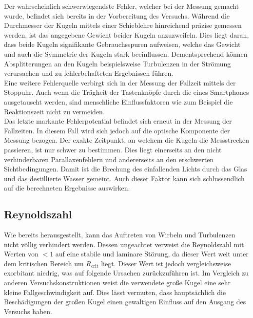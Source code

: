 Der wahrscheinlich schwerwiegendste Fehler, welcher bei der Messung gemacht wurde, befindet sich bereits in der Vorbereitung des 
Versuchs. Während die Durchmesser der Kugeln mittels einer Schieblehre hinreichend präzise gemessen werden, ist das angegebene 
Gewicht beider Kugeln anzuzweifeln. Dies liegt daran, dass beide Kugeln signifikante Gebrauchsspuren aufweisen, welche das Gewicht 
und auch die Symmetrie der Kugeln stark beeinflussen. Dementsprechend können Absplitterungen an den Kugeln beispielsweise Turbulenzen
in der Strömung verursachen und zu fehlerbehafteten Ergebnissen führen.\\
Eine weitere Fehlerquelle verbirgt sich in der Messung der Fallzeit mittels der Stoppuhr. Auch wenn die Trägheit der Tastenknöpfe durch 
die eines Smartphones ausgetauscht werden, sind menschliche Einflussfaktoren wie zum Beispiel die Reaktionszeit nicht zu vermeiden.\\
Das letzte markante Fehlerpotential befindet sich erneut in der Messung der Fallzeiten. In diesem Fall wird sich jedoch auf die 
optische Komponente der Messung bezogen. Der exakte Zeitpunkt, an welchem die Kugeln die Messstrecken passieren, ist nur schwer zu 
bestimmen. Dies liegt einerseits an den nicht verhinderbaren Parallaxenfehlern und andererseits an den erschwerten Sichtbedingungen.
Damit ist die Brechung des einfallenden Lichts durch das Glas und das destillierte Wasser gemeint. Auch dieser Faktor kann sich 
schlussendlich auf die berechneten Ergebnisse auswirken.

\subsection{Reynoldszahl}

Wie bereits herausgestellt, kann das Auftreten von Wirbeln und Turbulenzen nicht völlig verhindert werden. Dessen ungeachtet 
verweist die Reynoldszahl mit Werten von $< 1$ auf eine stabile und laminare Störung, da dieser Wert weit unter dem kritischen 
Bereich um $R_\text{crit}$ liegt. Dieser Wert ist jedoch vergleichsweise exorbitant niedrig, was auf folgende Ursachen zurückzuführen ist.
Im Vergleich zu anderen Versuchskonstruktionen weist die verwendete große Kugel eine sehr kleine Fallgeschwindigkeit auf. Dies lässt 
vermuten, dass hauptsächlich die Beschädigungen der großen Kugel einen gewaltigen Einfluss auf den Ausgang des Versuchs haben.
%
